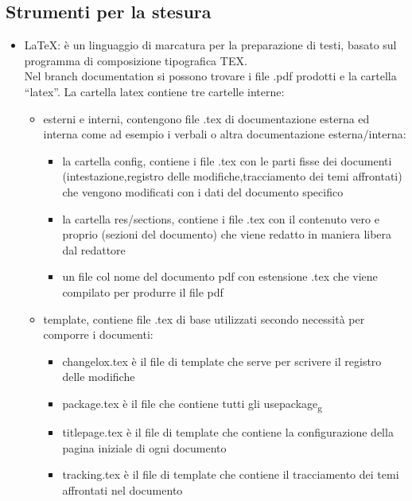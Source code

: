 \subsection{Strumenti per la stesura}
\begin{itemize} 
    \item LaTeX: è un linguaggio di marcatura per la preparazione di testi, basato sul 				  		  programma di composizione tipografica TEX.\\
	Nel branch documentation  si possono trovare i file .pdf prodotti e la cartella “latex”. La cartella latex contiene tre cartelle interne:
	\begin{itemize}
	\item esterni e interni, contengono file .tex di documentazione esterna ed interna come ad esempio i verbali o altra documentazione esterna/interna:
	\begin{itemize}
		\item la cartella config, contiene i file .tex con le parti fisse dei documenti (intestazione,registro delle modifiche,tracciamento dei temi affrontati) che vengono modificati con i dati del documento specifico 
		\item la cartella res/sections, contiene i file .tex con il contenuto vero e proprio (sezioni del documento) che viene redatto in maniera libera dal redattore
		\item un file col nome del documento pdf con estensione .tex che viene compilato per produrre il file pdf
	\end{itemize}
	 \item template, contiene file .tex di base utilizzati secondo necessità per comporre i documenti:
	 \begin{itemize}
	 \item changelox.tex è il file di template che serve per scrivere il registro delle modifiche
	 \item package.tex è il file che contiene tutti gli usepackage\textsubscript{g}
	 \item titlepage.tex è il file di template che contiene la configurazione della pagina iniziale di ogni documento  
	 \item tracking.tex è il file di template che contiene il tracciamento dei temi affrontati nel documento
	 \end{itemize}
	\end{itemize}
\end{itemize}